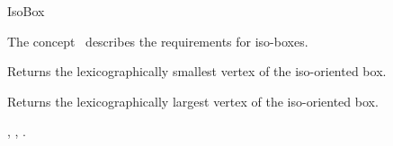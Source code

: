 

\begin{ccRefConcept}{IsoBox}


\ccDefinition
  
The concept \ccRefName\ describes the requirements for iso-boxes.


\ccTypes


\ccCreation
{}  %


\ccOperations

{Returns the lexicographically smallest vertex of the iso-oriented box.}


{Returns the  lexicographically largest vertex of the iso-oriented box.}


\ccHasModels

, , 
.

\end{ccRefConcept}


